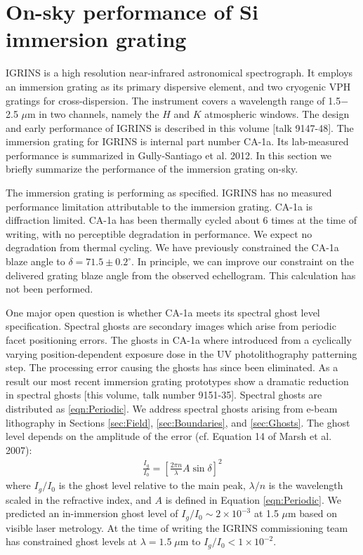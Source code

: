 \documentclass[]{spie}  %
\begin{document}
\section{On-sky performance of Si immersion grating}
IGRINS \cite{2010SPIE.7735E..54Y} is a high resolution near-infrared astronomical spectrograph.  It employs an immersion grating as its primary dispersive element, and two cryogenic VPH gratings for cross-dispersion.  The instrument covers a wavelength range of 1.5$-$2.5 $\mu$m in two channels, namely the $H$ and $K$ atmospheric windows.  The design and early performance of IGRINS is described in this volume [talk 9147-48]\cite{2014SPIE.CHANPARK.IGRINS}.  The immersion grating for IGRINS is internal part number CA-1a.  Its lab-measured performance is summarized in Gully-Santiago et al. 2012\cite{2012SPIE.8450E..2SG}.  In this section we briefly summarize the performance of the immersion grating on-sky.

The immersion grating is performing as specified.  IGRINS has no measured performance limitation attributable to the immersion grating.  CA-1a is diffraction limited.  CA-1a has been thermally cycled about 6 times at the time of writing, with no perceptible degradation in performance.  We expect no degradation from thermal cycling.  We have previously constrained the CA-1a blaze angle to $\delta = 71.5\pm 0.2^\circ$.  In principle, we can improve our constraint on the delivered grating blaze angle from the observed echellogram.  This calculation has not been performed.

One major open question is whether CA-1a meets its spectral ghost level specification.  Spectral ghosts are secondary images which arise from periodic facet positioning errors\cite{2007sdf..book.....J}. The ghosts in CA-1a where introduced from a cyclically varying position-dependent exposure dose in the UV photolithography patterning step.  The processing error causing the ghosts has since been eliminated.  As a result our most recent immersion grating prototypes show a dramatic reduction in spectral ghosts [this volume, talk number 9151-35]\cite{2014SPIE.BROOKS.GRATINGS}.  Spectral ghosts are distributed as \ref{eqn:Periodic}.  We address spectral ghosts arising from e-beam lithography in Sections \ref{sec:Field}, \ref{sec:Boundaries}, and  \ref{sec:Ghosts}.  The ghost level depends on the amplitude of the error (cf. Equation 14 of Marsh et al. 2007\cite{2007ApOpt..46.3400M}):
\begin{eqnarray}
	\frac{I_g}{I_0}=[ \frac{2\pi n}{\lambda}A \sin{\delta} ]^2	 \label{eqn:GLevel}
\end{eqnarray}
where $I_g/I_0$ is the ghost level relative to the main peak, $\lambda/n$ is the wavelength scaled in the refractive index, and $A$ is defined in Equation \ref{eqn:Periodic}.  We predicted an in-immersion ghost level of $I_g/I_0 \sim2\times10^{-3}$ at 1.5 $\mu$m based on visible laser metrology\cite{2012SPIE.8450E..2SG}.  At the time of writing the IGRINS commissioning team has constrained ghost levels at $\lambda=1.5 \; \mu$m to $I_g/I_0 < 1\times10^{-2}$.
\end{document}
